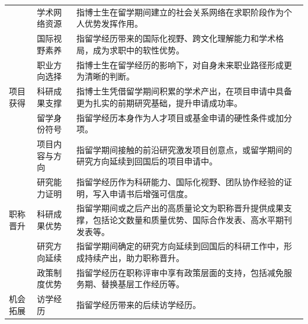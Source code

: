 {\begin{longtable}{p{2.5cm}p{3cm}p{9cm}}
 & 学术网络资源 & 指博士生在留学期间建立的社会关系网络在求职阶段作为个人优势发挥作用。 \\
 & 国际视野素养 & 指留学经历带来的国际化视野、跨文化理解能力和学术格局，成为求职中的软性优势。 \\
 & 职业方向选择 & 指博士生在留学经历的影响下，对自身未来职业路径形成更为清晰的判断。 \\
\midrule
项目获得 & 科研成果支撑 & 指博士生凭借留学期间积累的学术产出，在项目申请中具备更为扎实的前期研究基础，提升申请成功率。 \\
 & 留学身份符号 & 指留学经历本身作为人才项目或基金申请的硬性条件或加分项。 \\
 & 项目内容与方向 & 指留学期间接触的前沿研究激发项目创意点，或留学期间的研究方向延续到回国后的项目申请中。 \\
 & 研究能力证明 & 指留学经历作为科研能力、国际化视野、团队协作经验的证明，写入申请书后增强可信度。 \\
\midrule
职称晋升 & 科研成果优势 & 指留学期间或之后产出的高质量论文为职称晋升提供成果支撑，包括论文数量和质量优势、国际合作发表、高水平期刊发表等。 \\
 & 研究方向延续 & 指留学期间确定的研究方向延续到回国后的科研工作中，形成持续产出，助力职称晋升。 \\
 & 政策制度优势 & 指留学经历在职称评审中享有政策层面的支持，包括减免服务期、替换基层工作经历等。 \\
\midrule
机会拓展 & 访学经历 & 指留学经历带来的后续访学经历。 \\

\end{longtable}
}
